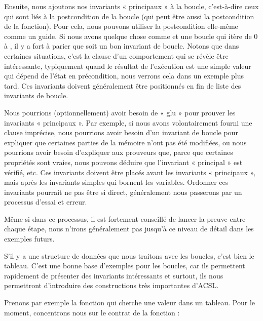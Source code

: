 Ensuite, nous ajoutons nos invariants « principaux » à la boucle, c'est-à-dire
ceux qui sont liés à la postcondition de la boucle (qui peut être aussi la
postcondition de la fonction). Pour cela, nous pouvons utiliser la postcondition
elle-même comme un guide. Si nous avons quelque chose comme
 et une boucle qui itère  de 0 à
, il y a fort à parier que  soit
un bon invariant de boucle. Notons que dans certaines situations, c'est la
clause  d'un comportement qui se révèle être intéressante,
typiquement quand le résultat de l'exécution est une simple valeur qui dépend
de l'état en précondition, nous verrons cela dans un exemple plus tard. Ces
invariants doivent généralement être positionnés en fin de liste des invariants
de boucle.


Nous pourrions (optionnellement) avoir besoin de « glu » pour prouver les
invariants « principaux ». Par exemple, si nous avons volontairement fourni
une clause  imprécise, nous pourrions avoir besoin
d'un invariant de boucle pour expliquer que certaines parties de la mémoire
n'ont pas été modifiées, ou nous pourrions avoir besoin d'expliquer aux
prouveurs que, parce que certaines propriétés sont vraies, nous pouvons déduire
que l'invariant « principal » est vérifié, etc. Ces invariants doivent être
placés avant les invariants « principaux », mais après les invariants simples
qui bornent les variables. Ordonner ces invariants pourrait ne pas être si
direct, généralement nous passerons par un processus d'essai et erreur.


Même si dans ce processus, il est fortement conseillé de lancer la preuve entre
chaque étape, nous n'irons généralement pas jusqu'à ce niveau de détail dans les
exemples futurs.


\label{l3:statements-loops-examples-ro}


S'il y a une structure de données que nous traitons avec les boucles, c'est bien
le tableau. C'est une bonne base d'exemples pour les boucles, car ils permettent
rapidement de présenter des invariants intéressants et surtout, ils nous
permettront d'introduire des constructions très importantes d'ACSL.


Prenons par exemple la fonction qui cherche une valeur dans un tableau. Pour le
moment, concentrons nous sur le contrat de la fonction :




